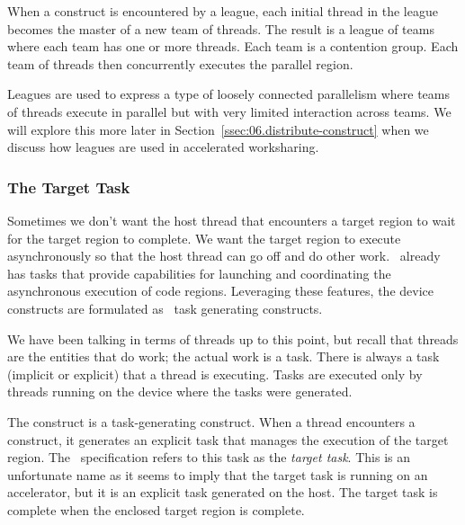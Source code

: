 When a  construct is encountered by a league, each initial
thread in the league becomes the master of a new team of threads. The result is
a league of teams where each team has one or more threads. Each team is a
contention group.  Each team of threads then concurrently executes the parallel
region.

Leagues are used to express a type of loosely connected parallelism where teams
of threads execute in parallel but with very limited interaction across teams.
We will explore this more later in Section~\ref{ssec:06.distribute-construct}
when we discuss how leagues are used in accelerated worksharing.

\subsubsection{The Target Task}
\label{ssec:06.target-task}

Sometimes we don't want the host thread that encounters a target region to wait
for the target region to complete.  We want the target region to execute
asynchronously so that the host thread can go off and do other work.
\OMP\ already has tasks that provide capabilities for launching and
coordinating the asynchronous execution of code regions.  Leveraging these
features, the device constructs are formulated as \OMP\ task generating
constructs. 

We have been talking in terms of threads up to this point, but recall that
threads are the entities that do work; the actual work is a task.  There is
always a task (implicit or explicit) that a thread is executing.  Tasks are
executed only by threads running on the device where the tasks were generated.

The  construct is a task-generating construct.  When a thread
encounters a  construct, it generates an explicit task that
manages the execution of the target region.  The \OMPfourfive\ specification
refers to this task as the \emph{target task}.  This is an unfortunate name as
it seems to imply that the target task is running on an accelerator, but it
is an explicit task generated on the host.  The target task is complete when
the enclosed target region is complete.

